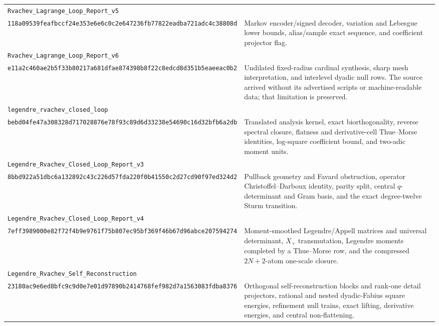 \documentclass[11pt,oneside]{article}
\numberwithin{equation}{section}
\theoremstyle{definition}
\theoremstyle{remark}
\begin{document}
\begin{center}
\begin{longtable}{@{}p{}p{}@{}}
\addlinespace
\nolinkurl{Rvachev_Lagrange_Loop_Report_v5}\\
\nolinkurl{118a09539feafbccf24e353e6e6c0c2e647236fb77822eadba721adc4c38808d}
& Markov encoder/signed decoder, variation and Lebesgue lower bounds,
alias/sample exact sequence, and coefficient projector flag.\\
\addlinespace
\nolinkurl{Rvachev_Lagrange_Loop_Report_v6}\\
\nolinkurl{e11a2c460ae2b5f33b80217a681dfae874398b8f22c8edcd8d351b5eaeeac0b2}
& Undilated fixed-radius cardinal synthesis, sharp mesh interpretation, and
interlevel dyadic null rows.  The source arrived without its advertised
scripts or machine-readable data; that limitation is preserved.\\
\addlinespace
\nolinkurl{legendre_rvachev_closed_loop}\\
\nolinkurl{bebd04fe47a308328d717028876e78f93c89d6d33238e54690c16d32bfb6a2db}
& Translated analysis kernel, exact biorthogonality, reverse spectral closure,
flatness and derivative-cell Thue--Morse identities, log-square coefficient
bound, and two-adic moment units.\\
\addlinespace
\nolinkurl{Legendre_Rvachev_Closed_Loop_Report_v3}\\
\nolinkurl{8bbd922a51dbc6a132892c43c226d57fda220f0b41550c2d27cd90f97ed324d2}
& Pullback geometry and Favard obstruction, operator
Christoffel--Darboux identity, parity split, central $q$-determinant and Gram
basis, and the exact degree-twelve Sturm transition.\\
\addlinespace
\nolinkurl{Legendre_Rvachev_Closed_Loop_Report_v4}\\
\nolinkurl{7eff3989000e82f72f4b9e9761f75b807ec95bf369f46b67d96abce207594274}
& Moment-smoothed Legendre/Appell matrices and universal determinant,
$X_+$ transmutation, Legendre moments completed by a Thue--Morse row, and the
compressed $2N+2$-atom one-scale closure.\\
\addlinespace
\nolinkurl{Legendre_Rvachev_Self_Reconstruction}\\
\nolinkurl{23180ac9e6ed8bfc9c9d0e7e01d97890b2414768fef982d7a1563083fdba8376}
& Orthogonal self-reconstruction blocks and rank-one detail projectors,
rational and nested dyadic-Fabius square energies, refinement null trains,
exact lifting, derivative energies, and central non-flattening.\\
\bottomrule
\end{longtable}
\end{center}
\end{document}
